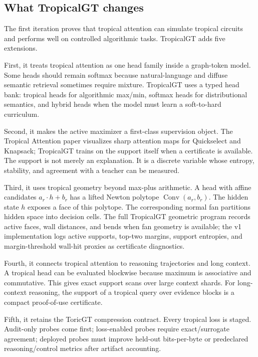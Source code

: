 \documentclass[11pt]{article}
\newcommand{\Conv}{\operatorname{Conv}}
\begin{document}
\subsection{What TropicalGT changes}

The first iteration proves that tropical attention can simulate tropical circuits and performs well on controlled algorithmic tasks.  TropicalGT adds five extensions.

First, it treats tropical attention as one head family inside a graph-token model.  Some heads should remain softmax because natural-language and diffuse semantic retrieval sometimes require mixture.  TropicalGT uses a typed head bank: tropical heads for algorithmic max/min, softmax heads for distributional semantics, and hybrid heads when the model must learn a soft-to-hard curriculum.

Second, it makes the active maximizer a first-class supervision object.  The Tropical Attention paper visualizes sharp attention maps for Quickselect and Knapsack; TropicalGT trains on the support itself when a certificate is available.  The support is not merely an explanation.  It is a discrete variable whose entropy, stability, and agreement with a teacher can be measured.

Third, it uses tropical geometry beyond max-plus arithmetic.  A head with affine candidates \(a_r\cdot h+b_r\) has a lifted Newton polytope \(\Conv(a_r,b_r)\).  The hidden state \(h\) exposes a face of this polytope.  The corresponding normal fan partitions hidden space into decision cells.  The full TropicalGT geometric program records active faces, wall distances, and bends when fan geometry is available; the v1 implementation logs active supports, top-two margins, support entropies, and margin-threshold wall-hit proxies as certificate diagnostics.

Fourth, it connects tropical attention to reasoning trajectories and long context.  A tropical head can be evaluated blockwise because maximum is associative and commutative.  This gives exact support scans over large context shards.  For long-context reasoning, the support of a tropical query over evidence blocks is a compact proof-of-use certificate.

Fifth, it retains the ToricGT compression contract.  Every tropical loss is staged.  Audit-only probes come first; loss-enabled probes require exact/surrogate agreement; deployed probes must improve held-out bits-per-byte or predeclared reasoning/control metrics after artifact accounting.
\end{document}
